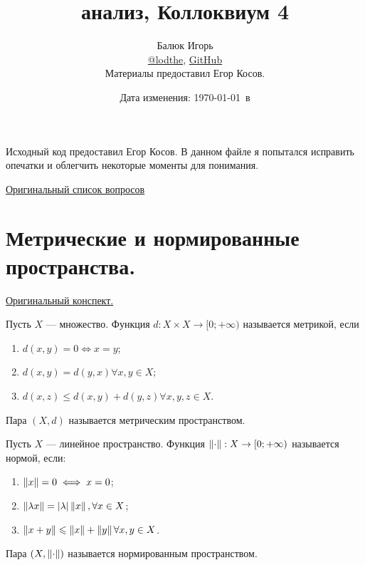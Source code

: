 \documentclass[a4paper]{article}
\title{\HugeМатематический анализ, Коллоквиум 4}
\author{
	Балюк Игорь \\
	\href{https://teleg.run/lodthe}{@lodthe},
    \href{https://github.com/LoDThe/hse-tex}{GitHub} \\
    Материалы предоставил Егор Косов.
}
\date{Дата изменения: \today \ в \currenttime}
\theoremstyle{named}
\begin{document}
    \maketitle

    \tableofcontents

    \newpage

    Исходный код предоставил Егор Косов. В данном файле я попытался исправить опечатки и облегчить некоторые моменты для понимания.

    \href{https://www.youtube.com/watch?v=dQw4w9WgXcQ}{Оригинальный список вопросов}

    \section{Метрические и нормированные пространства.}

    \href{https://www.dropbox.com/s/donysz87em9jfhs/%D0%9B%D0%B5%D0%BA%D1%86%D0%B8%D1%8F%208.pdf?dl=0}{Оригинальный конспект.}

    \begin{definition*}
        Пусть $X$ --- множество. Функция $d: X \times X \to [0; +\infty)$ называется метрикой, если
        \begin{enumerate}
        \item $d(x, y) = 0 \iff x = y$;
        \item $d(x, y) = d(y, x) \forall x, y \in X$;
        \item $d(x, z) \leq d(x, y) + d(y, z) \forall x, y, z \in X$.
        \end{enumerate}

        Пара $(X, d)$ называется метрическим пространством.
    \end{definition*}

    \begin{definition*}
        Пусть $X$ --- линейное пространство. Функция $\left\lVert\cdot\right\rVert: X \to [0; +\infty)$ называется нормой, если:
        \begin{enumerate}
        \item $\left\lVert x\right\rVert = 0 \iff x = 0$;
        \item $\left\lVert\lambda x\right\rVert = |\lambda| \left\lVert x\right\rVert, \forall x \in X$;
        \item $\left\lVert x + y\right\rVert \leqslant \left\lVert x\right\rVert + \left\lVert y\right\rVert \forall x, y \in X$.
        \end{enumerate}

        Пара $(X, \left\lVert\cdot\right\rVert)$ называется нормированным пространством.
    \end{definition*}
\end{document}

